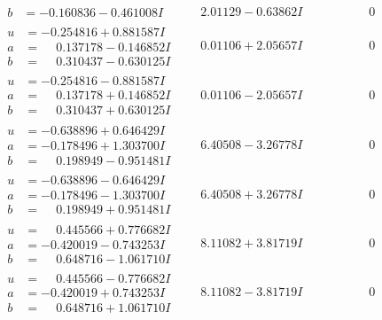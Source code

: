 \documentclass[1p]{elsarticle_modified}
\theoremstyle{definition}
\begin{document}
$$\begin{array}{c|c|c}
\begin{aligned}
b &= -0.160836 - 0.461008 I\end{aligned}
 & \phantom{-}2.01129 - 0.63862 I & \phantom{-0.000000 } 0 \\ \hline\begin{aligned}
u &= -0.254816 + 0.881587 I \\
a &= \phantom{-}0.137178 - 0.146852 I \\
b &= \phantom{-}0.310437 - 0.630125 I\end{aligned}
 & \phantom{-}0.01106 + 2.05657 I & \phantom{-0.000000 } 0 \\ \hline\begin{aligned}
u &= -0.254816 - 0.881587 I \\
a &= \phantom{-}0.137178 + 0.146852 I \\
b &= \phantom{-}0.310437 + 0.630125 I\end{aligned}
 & \phantom{-}0.01106 - 2.05657 I & \phantom{-0.000000 } 0 \\ \hline\begin{aligned}
u &= -0.638896 + 0.646429 I \\
a &= -0.178496 + 1.303700 I \\
b &= \phantom{-}0.198949 - 0.951481 I\end{aligned}
 & \phantom{-}6.40508 - 3.26778 I & \phantom{-0.000000 } 0 \\ \hline\begin{aligned}
u &= -0.638896 - 0.646429 I \\
a &= -0.178496 - 1.303700 I \\
b &= \phantom{-}0.198949 + 0.951481 I\end{aligned}
 & \phantom{-}6.40508 + 3.26778 I & \phantom{-0.000000 } 0 \\ \hline\begin{aligned}
u &= \phantom{-}0.445566 + 0.776682 I \\
a &= -0.420019 - 0.743253 I \\
b &= \phantom{-}0.648716 - 1.061710 I\end{aligned}
 & \phantom{-}8.11082 + 3.81719 I & \phantom{-0.000000 } 0 \\ \hline\begin{aligned}
u &= \phantom{-}0.445566 - 0.776682 I \\
a &= -0.420019 + 0.743253 I \\
b &= \phantom{-}0.648716 + 1.061710 I\end{aligned}
 & \phantom{-}8.11082 - 3.81719 I & \phantom{-0.000000 } 0 \\ \hline\begin{aligned}

\end{aligned}
\end{array}$$
\end{document}

